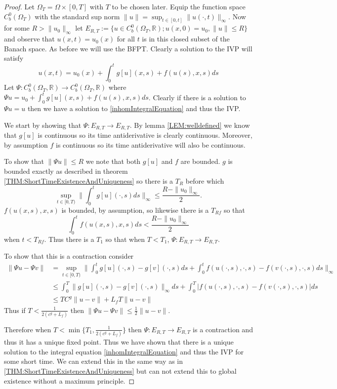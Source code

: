 \documentclass[aps,
preprint,
groupedaddress,
showkeys,
amsmath]{revtex4-2}
\begin{document}
\begin{proof}
    Let $\Omega_T=\Omega\times [0,T]$ with $T$ to be chosen later. Equip the function space $C^0_b(\Omega_T)$ with the standard sup norm $\|u\|=\sup_{t\in [0,t]}\|u(\cdot, t)\|_\infty.$ Now for some $R>\|u_0\|_\infty$ let $E_{R,T}:=\{u\in C^0_b(\Omega_T,\mathbb{R});u(x,0)=u_0,\|u\|\leq R\}$ and observe that $u(x,t)=u_0(x)$ for all $t$ is in this closed subset of the Banach space. As before we will use the BFPT. Clearly a solution to the IVP will satisfy
    \begin{equation}\label{inhomIntegralEquation}
        u(x,t)=u_0(x)+\int_0^tg[u](x,s)+f(u(s),x,s) ds
    \end{equation}
    Let $\Psi:C^0_b(\Omega_T,\mathbb{R})\to C^0_b(\Omega_T,\mathbb{R})$ where $\Psi u = u_0+\int_0^tg[u](x,s)+f(u(s),x,s)ds$. Clearly if there is a solution to $\Psi u=u$ then we have a solution to \eqref{inhomIntegralEquation} and thus the IVP.

    We start by showing that $\Psi:E_{R,T}\to E_{R,T}$. By lemma \ref{LEM:welldefined} we know that $g[u]$ is continuous so its time antiderivative is clearly continuous. Moreover, by assumption $f$ is continuous so its time antiderivative will also be continuous.

    To show that $\|\Psi u\|\leq R$  we note that both $g[u]$ and $f$ are bounded. $g$ is bounded exactly as described in theorem \ref{THM:ShortTimeExistenceAndUniqueness} so there is a $T_R$ before which 
    \[\sup_{t\in[0,T)}\|\int_0^tg[u](\cdot,s)ds\|_\infty \leq \frac{R-\|u_0\|_\infty}{2}.\] 
    $f(u(x,s),x,s)$ is bounded, by assumption, so likewise there is a $T_{Rf}$ so that \[\int_0^tf(u(x,s),x,s)ds<\frac{R-\|u_0\|_\infty}{2}\] when $t<T_{Rf}$. Thus there is a $T_1$ so that when $T<T_1$, $\Psi:E_{R,T}\to E_{R,T}$. 

    To show that this is a contraction consider 
    \begin{equation*}
        \begin{split}
            \|\Psi u-\Psi v\|&=\sup_{t\in[0,T)}\bigg\|\int_0^tg[u](\cdot,s)-g[v](\cdot,s)ds+\int_0^tf(u(\cdot,s),\cdot,s)-f(v(\cdot,s),\cdot,s)ds\bigg\|_\infty\\
            &\leq \int_0^T\|g[u](\cdot,s)-g[v](\cdot,s)\|_\infty ds+\int_0^T|f(u(\cdot,s),\cdot,s)-f(v(\cdot,s),\cdot,s)|ds\\
            &\leq TC^g\|u-v\|+L_fT\|u-v\|
        \end{split}
    \end{equation*}
    Thus if $T<\frac{1}{2(c^g+L_f)}$ then $\|\Psi u -\Psi v\|\leq \frac{1}{2}\|u-v\|$. 

    Therefore when $T<\min\{T_1,\frac{1}{2(c^g+L_f)}\}$ then $\Psi:E_{R,T}\to E_{R,T}$ is a contraction and thus it has a unique fixed point. Thus we have shown that there is a unique solution to the integral equation \eqref{inhomIntegralEquation} and thus the IVP for some short time. We can extend this in the same way as in \ref{THM:ShortTimeExistenceAndUniqueness} but can not extend this to global existence without a maximum principle.
    \end{proof}






\end{document}
